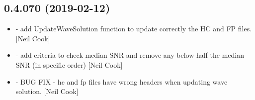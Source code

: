 \documentclass[a4paper,10pt,english]{report}
\begin{document}
\subsection{0.4.070 (2019-02-12)}
\label{\detokenize{misc/changelog:id188}}\begin{itemize}
\item {} 
 - add UpdateWaveSolution  function to
update correctly the HC and FP files. {[}Neil Cook{]}

\item {} 
 - add criteria to check median SNR and remove
any below half the median SNR (in specific order) {[}Neil Cook{]}

\item {} 
 - BUG FIX - hc and fp files have wrong
headers when updating wave solution. {[}Neil Cook{]}

\end{itemize}
\end{document}
